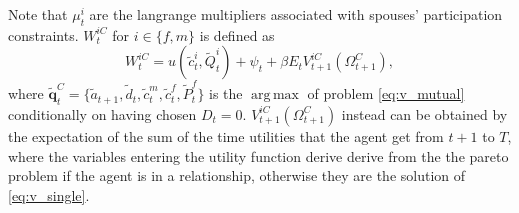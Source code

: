 \documentclass[12pt]{article}
\numberwithin{table}{section}
\DeclareMathOperator*{\argmax}{arg\,max}
\begin{document}
Note that $\mu^i_t$ are the langrange multipliers associated with spouses' participation constraints.
$W_{t}^{iC}$ for $i\in\{f,m\}$ is defined as 
\begin{equation}
W_{t}^{iC}=u(\tilde{c}_t^{i},\tilde{Q}_t^{i})+\psi_t+\beta E_t V_{t+1}^{iC}(\Omega^{C}_{t+1}),
\end{equation}
where
$\mathbf{\tilde{q}}^{C}_t=\{\tilde{a}_{t+1},\tilde{d}_{t},\tilde{c}^{m}_{t},\tilde{c}^{f}_{t},\tilde{P}^{f}_t\}$ is the $\argmax$ of problem \eqref{eq:v_mutual} conditionally on having chosen $D_t=0$. $V_{t+1}^{iC}(\Omega^{C}_{t+1})$ instead can be obtained by the expectation of the sum of the time utilities that the agent get from $t+1$ to $T$, where the variables entering the utility function derive derive from the the pareto problem if the agent is in a relationship, otherwise they are the solution of \eqref{eq:v_single}.
\end{document}

